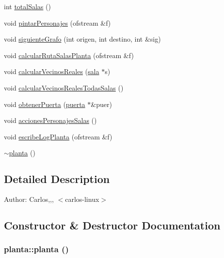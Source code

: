 \begin{CompactItemize}
\item 
int \hyperlink{classplanta_9d424f5bb63dbae72f7f3ed6906d7095}{totalSalas} ()
\item 
void \hyperlink{classplanta_40ec013e3c503f0675c688c5dce3828a}{pintarPersonajes} (ofstream \&f)
\item 
void \hyperlink{classplanta_2e62f6407ca66f91c2ef10647ec5f869}{siguienteGrafo} (int origen, int destino, int \&sig)
\item 
void \hyperlink{classplanta_d11674698b9703b7c570643723ced5fd}{calcularRutaSalasPlanta} (ofstream \&f)
\item 
void \hyperlink{classplanta_afb5b4511eeaa66b208cb6ec08c60a9e}{calcularVecinosReales} (\hyperlink{classsala}{sala} $\ast$s)
\item 
void \hyperlink{classplanta_40af5c175ab9b779d8aceebc0c4361c2}{calcularVecinosRealesTodasSalas} ()
\item 
void \hyperlink{classplanta_d66544ed0d0c8f20a98d7c8ce401a43f}{obtenerPuerta} (\hyperlink{classpuerta}{puerta} $\ast$\&puer)
\item 
void \hyperlink{classplanta_015d9890a348a62c9680edaec54c3975}{accionesPersonajesSalas} ()
\item 
void \hyperlink{classplanta_715eedf1f6fab5d7daa52a2b7cbb2744}{escribeLogPlanta} (ofstream \&f)
\item 
\hyperlink{classplanta_a86392313eeb2f2c217454abf0c7e216}{$\sim$planta} ()
\end{CompactItemize}


\subsection{Detailed Description}
\begin{Desc}
\item[Author:]Carlos,,, $<$carlos-linux$>$ \end{Desc}


\subsection{Constructor \& Destructor Documentation}
\hypertarget{classplanta_4c93b85a355bf29b1613cc22f0ed0f46}{
\subsubsection[planta]{\setlength{\rightskip}{0pt plus 5cm}planta::planta ()}}
\label{classplanta_4c93b85a355bf29b1613cc22f0ed0f46}



